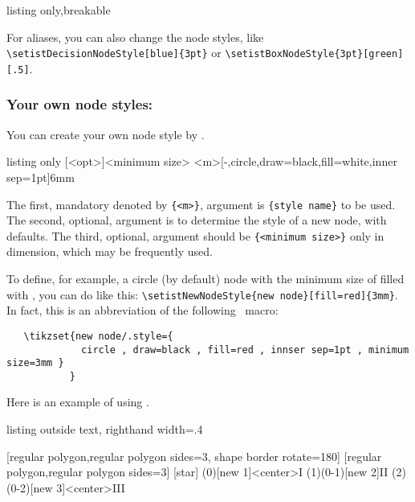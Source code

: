 \begin{tcblisting}{listing only,breakable}
\tikzset{box node/.style=rectangle node}
\tikzset{square node/.style=rectangle node}
\tikzset{oval node/.style=ellipse node}
\end{tcblisting}

For aliases, you can also change the node styles, like \verb|\setistDecisionNodeStyle[blue]{3pt}| or \verb|\setistBoxNodeStyle{3pt}[green][.5]|.

\subsubsection{Your own node styles: \protect\cmd{\setistNewNodeStyle}}

You can create your own node style by \icmd{\setistNewNodeStyle}.

\begin{tcblisting}{listing only}
  [<opt>]{<minimum size>}
  {<m>}[-,circle,draw=black,fill=white,inner sep=1pt]{6mm}
\end{tcblisting}

The first, mandatory denoted by \verb+{<m>}+, argument is \verb+{style name}+ to be used.
The second, optional, argument is \xw{[<options>]} to determine the style of a new node, with defaults.
The third, optional, argument should be \verb+{<minimum size>}+ only in dimension, which may be frequently used.

To define, for example, a circle (by default) node with the minimum size of \xw{3mm} filled with , you can do like this: \verb+\setistNewNodeStyle{new node}[fill=red]{3mm}+. In fact, this is an abbreviation of the following \TikZ\ macro:
\begin{verbatim}
   \tikzset{new node/.style={
             circle , draw=black , fill=red , innser sep=1pt , minimum size=3mm }
           }
\end{verbatim}

Here is an example of using \cmd{\setistNewNodeStyle}.

\begin{tcblisting}{listing outside text, righthand width=.4\linewidth}
\begin{istgame}[scale=1.5]
  [regular polygon,regular polygon sides=3,
   shape border rotate=180]
  [regular polygon,regular polygon sides=3]
[star]
\xtdistance{15mm}{30mm}
\istroot(0)[new 1]<center>{I}
  \istb  \istb  \endist
\xtdistance{15mm}{15mm}
\istrooto(1)(0-1)[new 2]{II} %
  \istb  \istb  \endist
\istroot(2)(0-2)[new 3]<center>{III}
  \istb  \istb  \endist
\end{istgame}
\end{tcblisting}     

